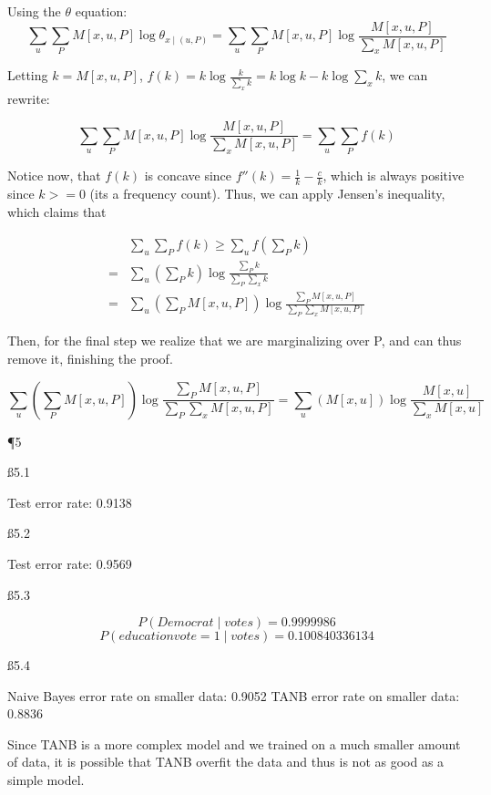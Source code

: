 Using the $\theta$ equation:
\[
\sum_{u} \sum_{P} M[x,u,P] \log \theta_{x \mid (u,P)} = \sum_{u} \sum_{P} M[x,u,P] \log \frac{M[x,u,P]}{\sum_x M[x,u,P]}
\]

Letting $k = M[x,u,P]$, $f(k) = k \log \frac{k}{\sum_x k} = k \log k - k \log{\sum_x k} $, we can rewrite:

\[
\sum_{u} \sum_{P} M[x,u,P] \log \frac{M[x,u,P]}{\sum_x M[x,u,P]} = \sum_{u} \sum_{P} f(k)
\]

Notice now, that $f(k)$ is concave since $f''(k) = \frac{1}{k}-\frac{c}{k}$, which is always positive since $k >=0$ (its a frequency count). Thus, we can apply Jensen's inequality, which claims that 

\begin{align*}
& \sum_{u} \sum_{P} f(k) \ge \sum_{u} f(\sum_{P} k) \\ =   & \sum_{u} (\sum_{P} k) \log \frac{\sum_{P} k}{\sum_{P} \sum_x k} \\
=   & \sum_{u} (\sum_{P} M[x,u,P]) \log \frac{\sum_{P} M[x,u,P]}{\sum_{P} \sum_x M[x,u,P]}
\end{align*}

Then, for the final step we realize that we are marginalizing over P, and can thus remove it, finishing the proof.

\[
\sum_{u} (\sum_{P} M[x,u,P]) \log \frac{\sum_{P} M[x,u,P]}{\sum_{P} \sum_x M[x,u,P]} = \sum_{u} ( M[x,u]) \log \frac{M[x,u]}{\sum_x M[x,u]}
\]

\P 5

\ss {5.1}

Test error rate: 0.9138

\ss {5.2}

Test error rate: 0.9569

\ss {5.3}

\[ P (Democrat \mid votes) = 0.9999986 \]
\[ P (educationvote=1 \mid votes) = 0.100840336134 \]

\ss {5.4}

Naive Bayes error rate on smaller data: 0.9052
TANB error rate on smaller data: 0.8836

Since TANB is a more complex model and we trained on a much smaller amount of data, it is possible that TANB overfit the data and thus is not as good as a simple model.


